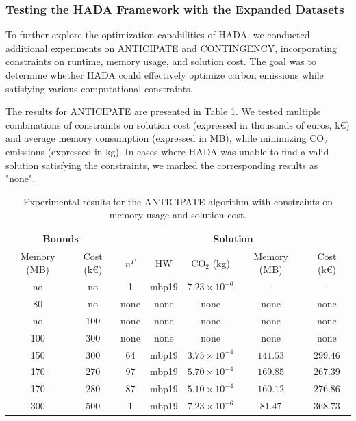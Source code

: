 \documentclass[a4paper,singleside,12pt]{report} %
\begin{document}
\subsubsection{Testing the HADA Framework with the Expanded Datasets}

To further explore the optimization capabilities of HADA, we conducted additional experiments on ANTICIPATE and CONTINGENCY, incorporating constraints on runtime, memory usage, and 
solution cost. The goal was to determine whether HADA could effectively optimize carbon emissions while satisfying various computational constraints. 

The results for ANTICIPATE are presented in Table \ref{tab:anticipate_results}. We tested multiple combinations of constraints on solution cost (expressed in thousands of euros, k€) and 
average memory consumption (expressed in MB), while minimizing CO$_2$ emissions (expressed in kg). In cases where HADA was unable to find a valid solution satisfying the constraints, we 
marked the corresponding results as "none".

\begin{table}[h!]
    \centering
    \begin{tabular}{|cc|ccccc|}
        \hline
        \multicolumn{2}{|c|}{Bounds} & \multicolumn{5}{c|}{Solution} \\
        \hline
        Memory (MB) & Cost (k€) & $n^P$ & HW & CO$_2$ (kg) & Memory (MB) & Cost (k€) \\
        \hline
        no & no & 1 & mbp19 & $7.23 \times 10^{-6}$ & - & - \\
        80 & no & none & none & none & none & none \\
        no & $100$ & none & none & none & none & none \\
        100 & $300$ & none & none & none & none & none \\
        150 & $300$ & 64 & mbp19 & $3.75 \times 10^{-4}$ & $141.53$ & $299.46$ \\
        170 & $270$ & 97 & mbp19 & $5.70 \times 10^{-4}$ & $169.85$ & $267.39$ \\
        170 & $280$ & 87 & mbp19 & $5.10 \times 10^{-4}$ & $160.12$ & $276.86$ \\
        300 & $500$ & 1 & mbp19 & $7.23 \times 10^{-6}$ & $81.47$ & $368.73$ \\
        \hline
    \end{tabular}
    \caption{Experimental results for the ANTICIPATE algorithm with constraints on memory usage and solution cost.}
    \label{tab:anticipate_results}
\end{table}
\end{document}
